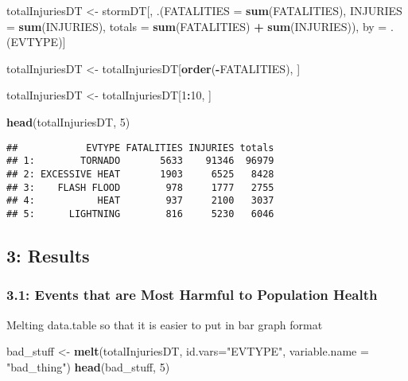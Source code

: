 \documentclass[
]{article}
\newenvironment{Shaded}{\begin{snugshade}}{\end{snugshade}}
\newcommand{\DataTypeTok}[1]{\textcolor[rgb]{0.13,0.29,0.53}{#1}}
\newcommand{\DecValTok}[1]{\textcolor[rgb]{0.00,0.00,0.81}{#1}}
\newcommand{\KeywordTok}[1]{\textcolor[rgb]{0.13,0.29,0.53}{\textbf{#1}}}
\newcommand{\NormalTok}[1]{#1}
\newcommand{\OperatorTok}[1]{\textcolor[rgb]{0.81,0.36,0.00}{\textbf{#1}}}
\newcommand{\StringTok}[1]{\textcolor[rgb]{0.31,0.60,0.02}{#1}}
\begin{document}
\begin{Shaded}
\begin{Highlighting}[]
\NormalTok{totalInjuriesDT <-}\StringTok{ }\NormalTok{stormDT[, .(}\DataTypeTok{FATALITIES =} \KeywordTok{sum}\NormalTok{(FATALITIES), }\DataTypeTok{INJURIES =} \KeywordTok{sum}\NormalTok{(INJURIES), }\DataTypeTok{totals =} \KeywordTok{sum}\NormalTok{(FATALITIES) }\OperatorTok{+}\StringTok{ }\KeywordTok{sum}\NormalTok{(INJURIES)), by =}\StringTok{ }\NormalTok{.(EVTYPE)]}

\NormalTok{totalInjuriesDT <-}\StringTok{ }\NormalTok{totalInjuriesDT[}\KeywordTok{order}\NormalTok{(}\OperatorTok{-}\NormalTok{FATALITIES), ]}

\NormalTok{totalInjuriesDT <-}\StringTok{ }\NormalTok{totalInjuriesDT[}\DecValTok{1}\OperatorTok{:}\DecValTok{10}\NormalTok{, ]}

\KeywordTok{head}\NormalTok{(totalInjuriesDT, }\DecValTok{5}\NormalTok{)}
\end{Highlighting}
\end{Shaded}

\begin{verbatim}
##            EVTYPE FATALITIES INJURIES totals
## 1:        TORNADO       5633    91346  96979
## 2: EXCESSIVE HEAT       1903     6525   8428
## 3:    FLASH FLOOD        978     1777   2755
## 4:           HEAT        937     2100   3037
## 5:      LIGHTNING        816     5230   6046
\end{verbatim}

\hypertarget{results}{%
\subsection{3: Results}\label{results}}

\hypertarget{events-that-are-most-harmful-to-population-health}{%
\subsubsection{3.1: Events that are Most Harmful to Population
Health}\label{events-that-are-most-harmful-to-population-health}}

Melting data.table so that it is easier to put in bar graph format

\begin{Shaded}
\begin{Highlighting}[]
\NormalTok{bad_stuff <-}\StringTok{ }\KeywordTok{melt}\NormalTok{(totalInjuriesDT, }\DataTypeTok{id.vars=}\StringTok{"EVTYPE"}\NormalTok{, }\DataTypeTok{variable.name =} \StringTok{"bad_thing"}\NormalTok{)}
\KeywordTok{head}\NormalTok{(bad_stuff, }\DecValTok{5}\NormalTok{)}
\end{Highlighting}
\end{Shaded}
\end{document}
